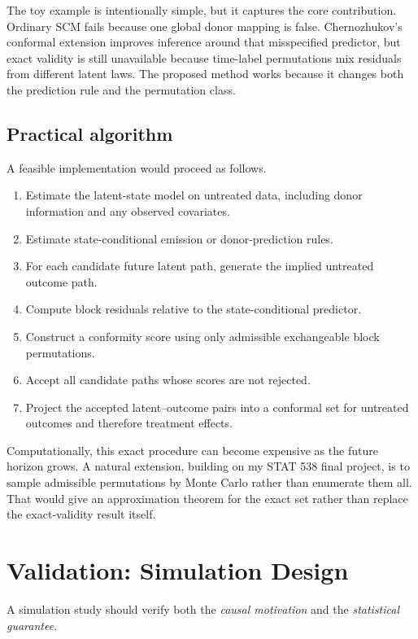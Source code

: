 \documentclass[11pt]{article}
\begin{document}
The toy example is intentionally simple, but it captures the core contribution. Ordinary SCM fails because one global donor mapping is false. Chernozhukov's conformal extension improves inference around that misspecified predictor, but exact validity is still unavailable because time-label permutations mix residuals from different latent laws. The proposed method works because it changes both the prediction rule and the permutation class.

\subsection{Practical algorithm}

A feasible implementation would proceed as follows.

\begin{enumerate}[label=\arabic*.]
    \item Estimate the latent-state model on untreated data, including donor information and any observed covariates.
    \item Estimate state-conditional emission or donor-prediction rules.
    \item For each candidate future latent path, generate the implied untreated outcome path.
    \item Compute block residuals relative to the state-conditional predictor.
    \item Construct a conformity score using only admissible exchangeable block permutations.
    \item Accept all candidate paths whose scores are not rejected.
    \item Project the accepted latent--outcome pairs into a conformal set for untreated outcomes and therefore treatment effects.
\end{enumerate}

Computationally, this exact procedure can become expensive as the future horizon grows. A natural extension, building on my STAT 538 final project, is to sample admissible permutations by Monte Carlo rather than enumerate them all. That would give an approximation theorem for the exact set rather than replace the exact-validity result itself.

\section{Validation: Simulation Design}

A simulation study should verify both the \emph{causal motivation} and the \emph{statistical guarantee}.
\end{document}
